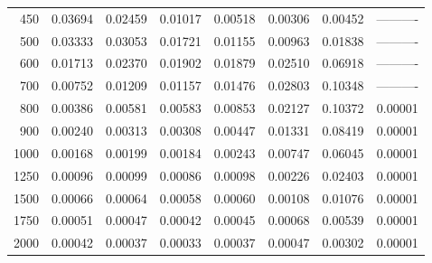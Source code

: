 \begin{table}[ht]
\begin{tabular}{r|c|c|c|c|c|c|c}
      450 & 0.03694 & 0.02459 & 0.01017 & 0.00518 & 0.00306 & 0.00452 & ---------- \\
      500 & 0.03333 & 0.03053 & 0.01721 & 0.01155 & 0.00963 & 0.01838 & ---------- \\
      600 & 0.01713 & 0.02370 & 0.01902 & 0.01879 & 0.02510 & 0.06918 & ---------- \\
      700 & 0.00752 & 0.01209 & 0.01157 & 0.01476 & 0.02803 & 0.10348 & ---------- \\
      800 & 0.00386 & 0.00581 & 0.00583 & 0.00853 & 0.02127 & 0.10372 & 0.00001 \\
      900 & 0.00240 & 0.00313 & 0.00308 & 0.00447 & 0.01331 & 0.08419 & 0.00001 \\
     1000 & 0.00168 & 0.00199 & 0.00184 & 0.00243 & 0.00747 & 0.06045 & 0.00001 \\
     1250 & 0.00096 & 0.00099 & 0.00086 & 0.00098 & 0.00226 & 0.02403 & 0.00001 \\
     1500 & 0.00066 & 0.00064 & 0.00058 & 0.00060 & 0.00108 & 0.01076 & 0.00001 \\
     1750 & 0.00051 & 0.00047 & 0.00042 & 0.00045 & 0.00068 & 0.00539 & 0.00001 \\
     2000 & 0.00042 & 0.00037 & 0.00033 & 0.00037 & 0.00047 & 0.00302 & 0.00001 \\ \cline{1-8}
    \end{tabular}
    \label{tab:XRayEffODE4}
\end{table}